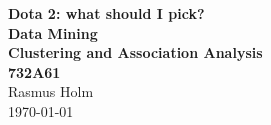 \documentclass[report.tex]{subfiles}
\begin{document}
\begin{titlepage}
  \begin{center}
    \Large\textbf{%
      \Huge Dota 2: what should I pick?  \\
      \Large Data Mining \\
      Clustering and Association Analysis  \\
      732A61
    } \\
    \vspace{2.5mm}
    \large Rasmus Holm \\
    \vfill
    \large \today
  \end{center}
\end{titlepage}
\end{document}
